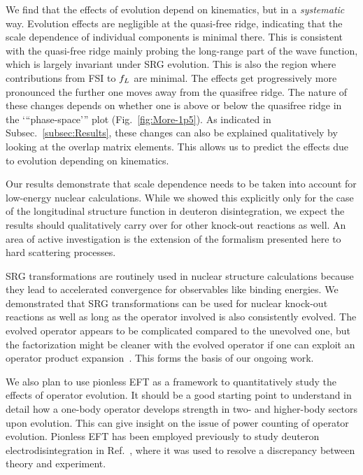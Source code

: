 	We find that the effects of evolution depend on kinematics,
	but in a \emph{systematic} way.  Evolution effects are negligible at the
	quasi-free ridge,	indicating that the
	scale dependence of individual components is minimal there.  This is
	consistent with the quasi-free ridge mainly probing the long-range part of
	the	wave function, which is largely invariant under SRG evolution.  This is
	also the region where contributions from FSI to $f_L$ are minimal.
	The effects get progressively more pronounced the further one moves away from
	the quasifree ridge.  The nature of these changes depends on whether one
	is above or below the quasifree ridge in the ‘“phase-space’” plot
	(Fig.~\ref{fig:More-1p5}).
	As indicated in Subsec.~\ref{subsec:Results}, these changes can also be
	explained qualitatively
	by looking at the overlap matrix elements.  This allows us to predict the
	effects due to evolution depending on kinematics.

	Our results demonstrate that scale dependence needs to be taken into account
	for low-energy nuclear calculations.  While we showed this explicitly only
	for	the case of the longitudinal structure function in deuteron
	disintegration,	we expect the results should qualitatively
	carry over for other knock-out reactions as well.
	An area of active investigation is the extension of the formalism presented
	here to hard scattering processes.


	SRG transformations are routinely used in nuclear structure calculations
	because	they lead to accelerated convergence for observables like binding
	energies.  We
	demonstrated that SRG transformations can be used for nuclear knock-out
	reactions as well as long as the operator involved is also consistently
	evolved. 	The evolved operator appears to be complicated compared to the
	unevolved one,
	but the factorization might be cleaner with the evolved operator if one can
	exploit an operator product expansion~\cite{Anderson:2010aq,Bogner:2012zm}.
	This forms the basis of our ongoing work.

	We also plan to use pionless EFT as a framework to quantitatively study the
	effects of operator evolution.  It should be a good starting point to
	understand in detail how a one-body operator develops strength in two- and
	higher-body sectors upon evolution.  This can give insight on the issue of
	power	counting of operator evolution.  Pionless EFT has been employed
	previously to
	study deuteron electrodisintegration in Ref.~\cite{Christlmeier:2008ye}, where
	it was used to resolve a discrepancy between theory and experiment.

